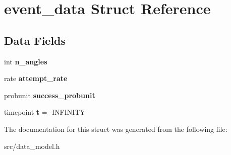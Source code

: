 \hypertarget{structevent__data}{}\section{event\+\_\+data Struct Reference}
\label{structevent__data}
\subsection*{Data Fields}
\begin{DoxyCompactItemize}
\item 
\mbox{\label{structevent__data_a4ac8163657589d149ed034f321b61ce9}} 
int {\bfseries n\+\_\+angles}
\item 
\mbox{\label{structevent__data_aa12da1e46a4e8e401433e90fd97fc015}} 
rate {\bfseries attempt\+\_\+rate}
\item 
\mbox{\label{structevent__data_ad6cde362c75774001ec8a7d24a580452}} 
probunit {\bfseries success\+\_\+probunit}
\item 
\mbox{\label{structevent__data_aa2f4362fb8d987420d6941e29cb50710}} 
timepoint {\bfseries t} = -\/I\+N\+F\+I\+N\+I\+TY
\end{DoxyCompactItemize}


The documentation for this struct was generated from the following file\+:\begin{DoxyCompactItemize}
\item 
src/data\+\_\+model.\+h\end{DoxyCompactItemize}
